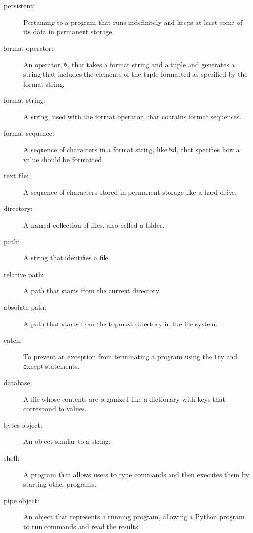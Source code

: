 \documentclass[
DIV=11,
fontsize=12,
twoside,
headinclude=false,
titlepage=firstiscover,
abstract=true,
headsepline=true,
footsepline=true,
chapterprefix=true, %
headings=big,
bibliography=totoc,%
captions=tableheading
]{scrbook}
\theoremstyle{definition}
\begin{document}
\begin{description}

\item[persistent:] Pertaining to a program that runs indefinitely
and keeps at least some of its data in permanent storage.

\item[format operator:] An operator, {\texttt \%}, that takes a format
string and a tuple and generates a string that includes
the elements of the tuple formatted as specified by the format string.

\item[format string:] A string, used with the format operator, that
contains format sequences.  

\item[format sequence:] A sequence of characters in a format string,
like {\texttt \%d}, that specifies how a value should be formatted.

\item[text file:] A sequence of characters stored in permanent
storage like a hard drive.

\item[directory:] A named collection of files, also called a folder.

\item[path:] A string that identifies a file.

\item[relative path:] A path that starts from the current directory.

\item[absolute path:] A path that starts from the topmost directory
in the file system.

\item[catch:] To prevent an exception from terminating
a program using the {\texttt try}
and {\texttt except} statements.

\item[database:] A file whose contents are organized like a dictionary
with keys that correspond to values.

\item[bytes object:] An object similar to a string.

\item[shell:] A program that allows users to type commands and then
executes them by starting other programs.

\item[pipe object:] An object that represents a running program, allowing
a Python program to run commands and read the results.

\end{description}
\end{document}
